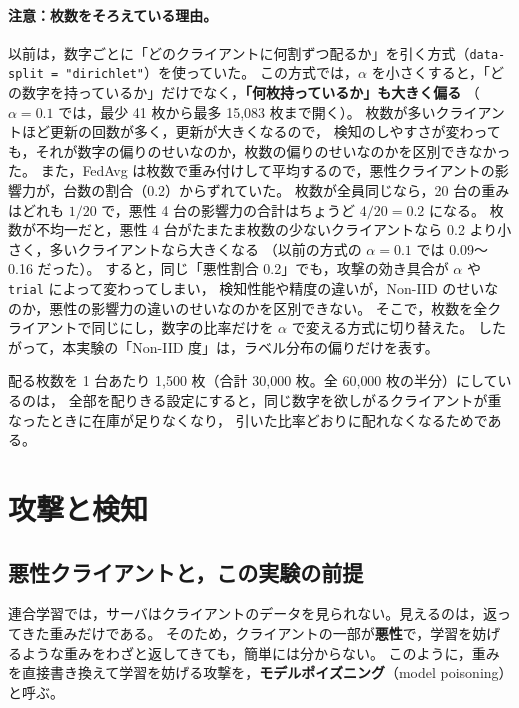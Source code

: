 \documentclass[a4j, dvipdfmx]{jsarticle}  %
\begin{document}
\paragraph{注意：枚数をそろえている理由。}
以前は，数字ごとに「どのクライアントに何割ずつ配るか」を引く方式（\texttt{data-split = "dirichlet"}）を使っていた。
この方式では，$\alpha$ を小さくすると，「どの数字を持っているか」だけでなく，\textbf{「何枚持っているか」も大きく偏る}
（$\alpha = 0.1$ では，最少 41 枚から最多 15{,}083 枚まで開く）。
枚数が多いクライアントほど更新の回数が多く，更新が大きくなるので，
検知のしやすさが変わっても，それが数字の偏りのせいなのか，枚数の偏りのせいなのかを区別できなかった。
また，FedAvg は枚数で重み付けして平均するので，悪性クライアントの影響力が，台数の割合（0.2）からずれていた。
枚数が全員同じなら，20 台の重みはどれも $1/20$ で，悪性 4 台の影響力の合計はちょうど $4/20 = 0.2$ になる。
枚数が不均一だと，悪性 4 台がたまたま枚数の少ないクライアントなら 0.2 より小さく，多いクライアントなら大きくなる
（以前の方式の $\alpha = 0.1$ では 0.09〜0.16 だった）。
すると，同じ「悪性割合 0.2」でも，攻撃の効き具合が $\alpha$ や \texttt{trial} によって変わってしまい，
検知性能や精度の違いが，Non-IID のせいなのか，悪性の影響力の違いのせいなのかを区別できない。
そこで，枚数を全クライアントで同じにし，数字の比率だけを $\alpha$ で変える方式に切り替えた。
したがって，本実験の「Non-IID 度」は，ラベル分布の偏りだけを表す。

配る枚数を 1 台あたり 1{,}500 枚（合計 30{,}000 枚。全 60{,}000 枚の半分）にしているのは，
全部を配りきる設定にすると，同じ数字を欲しがるクライアントが重なったときに在庫が足りなくなり，
引いた比率どおりに配れなくなるためである。

\section{攻撃と検知}
\label{sec:theory-attack}

\subsection{悪性クライアントと，この実験の前提}

連合学習では，サーバはクライアントのデータを見られない。見えるのは，返ってきた重みだけである。
そのため，クライアントの一部が\textbf{悪性}で，学習を妨げるような重みをわざと返してきても，簡単には分からない。
このように，重みを直接書き換えて学習を妨げる攻撃を，\textbf{モデルポイズニング}（model poisoning）と呼ぶ。
\end{document}
